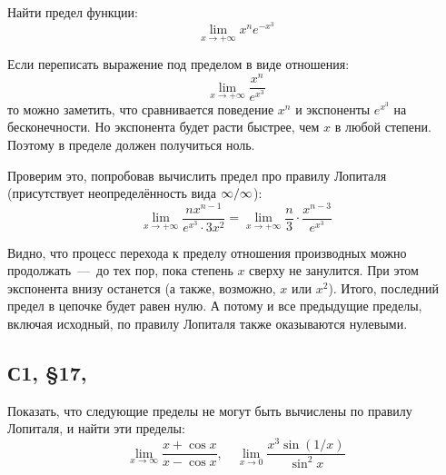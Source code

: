 \documentclass[a4paper,12pt]{article}
\begin{document}
  Найти предел функции:
  \[
    \lim_{x \to +\infty} x^n e^{-x^3}
  \]
  
  \begin{solution}
    Если переписать выражение под пределом в виде отношения:
    \[
      \lim_{x \to +\infty} \frac{x^n}{e^{x^3}}
    \]
    то можно заметить, что сравнивается поведение $x^n$ и экспоненты $e^{x^3}$ на бесконечности.
    Но экспонента будет расти быстрее, чем $x$ в любой степени.
    Поэтому в пределе должен получиться ноль.

    Проверим это, попробовав вычислить предел про правилу Лопиталя (присутствует неопределённость вида $\infty \hm/ \infty$):
    \[
      \lim_{x \to +\infty} \frac{n x^{n - 1}}{e^{x^3} \cdot 3x^2} = \lim_{x \to +\infty} \frac{n}{3} \cdot \frac{x^{n - 3}}{e^{x^3}}
    \]

    Видно, что процесс перехода к пределу отношения производных можно продолжать~---~до тех пор, пока степень $x$ сверху не занулится.
    При этом экспонента внизу останется (а также, возможно, $x$ или $x^2$).
    Итого, последний предел в цепочке будет равен нулю.
    А потому и все предыдущие пределы, включая исходный, по правилу Лопиталя также оказываются нулевыми.
  \end{solution}
  
  
  
  \subsection{С1, \S 17, }
  
  Показать, что следующие пределы не могут быть вычислены по правилу Лопиталя, и найти эти пределы:
  \[
    \lim_{x \to \infty} \frac{x + \cos x}{x - \cos x}, \quad \lim_{x \to 0} \frac{x^3 \sin{(1/x)}}{\sin^2 x}
  \]
  
\end{document}
